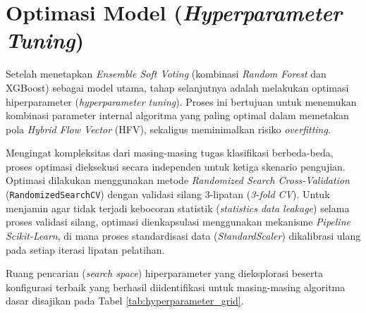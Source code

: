 \section{Optimasi Model (\textit{Hyperparameter Tuning})}
\label{sec:optimasi_model}

Setelah menetapkan \textit{Ensemble Soft Voting} (kombinasi \textit{Random Forest} dan XGBoost) sebagai model utama, tahap selanjutnya adalah melakukan optimasi hiperparameter (\textit{hyperparameter tuning}). Proses ini bertujuan untuk menemukan kombinasi parameter internal algoritma yang paling optimal dalam memetakan pola \textit{Hybrid Flow Vector} (HFV), sekaligus meminimalkan risiko \textit{overfitting}.

Mengingat kompleksitas dari masing-masing tugas klasifikasi berbeda-beda, proses optimasi dieksekusi secara independen untuk ketiga skenario pengujian. Optimasi dilakukan menggunakan metode \textit{Randomized Search Cross-Validation} (\texttt{RandomizedSearchCV}) dengan validasi silang 3-lipatan (\textit{3-fold CV}). Untuk menjamin agar tidak terjadi kebocoran statistik (\textit{statistics data leakage}) selama proses validasi silang, optimasi dienkapsulasi menggunakan mekanisme \textit{Pipeline} \textit{Scikit-Learn}, di mana proses standardisasi data (\textit{StandardScaler}) dikalibrasi ulang pada setiap iterasi lipatan pelatihan.

Ruang pencarian (\textit{search space}) hiperparameter yang dieksplorasi beserta konfigurasi terbaik yang berhasil diidentifikasi untuk masing-masing algoritma dasar disajikan pada Tabel \ref{tab:hyperparameter_grid}.


